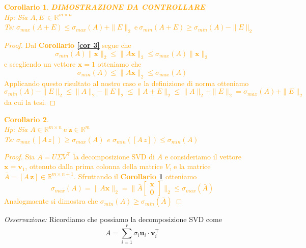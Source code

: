 \documentclass[11pt]{article}
\newtheorem{corollary}{Corollario}
\newcommand{\R}{\mathbb{R}} %
\begin{document}
\textcolor{orange}{
\begin{corollary}\label{cor 5}
\textbf{ DIMOSTRAZIONE DA CONTROLLARE }\\
\textit{Hp:} Sia $A,E \ \in \R^{m \times n}$\\
\textit{Ts:} $\sigma_{max}(A+E) \leq \sigma_{max}(A) + \|E\|_2 \ \text{e} \ \sigma_{min}(A+E) \geq \sigma_{min}(A) - \|E\|_2$ 
\end{corollary}
\begin{proof}
Dal \textbf{Corollario \ref{cor 3}}  segue che $$\sigma_{min}(A)\|\mathbf{x}\|_2 \leq \|A\mathbf{x}\|_2 \leq \sigma_{max}(A)\|\mathbf{x}\|_2$$
e scegliendo un vettore $\mathbf{x}=1$ otteniamo che
\[
\sigma_{min}(A) \leq \|A\mathbf{x}\|_2 \leq \sigma_{max}(A)
\]
Applicando questo risultato al nostro caso e la definizione di norma otteniamo
$$ \sigma_{min}(A) - \|E\|_2 \leq \|A\|_2 - \|E\|_2 \leq \|A+E\|_2 \leq \|A\|_2 + \|E\|_2 = \sigma_{max}(A) + \|E\|_2  $$
da cui la tesi. 
\end{proof}
}\textcolor{orange}{
\begin{corollary}\label{cor 6}
\textbf{}\\
\textit{Hp:} Sia $A \in \R^{m \times n} \ \text{e} \ \mathbf{z}\in \R^m$\\
\textit{Ts:} $\sigma_{max}([A \, z]) \geq \sigma_{max}(A)$ e $\sigma_{min}([A \, z]) \leq \sigma_{min}(A)$
\end{corollary}
\begin{proof}
Sia $A=U\Sigma V^\top      $ la decomposizione SVD di $A$ e consideriamo il vettore $\mathbf{x}= \mathbf{v}_1$, ottenuto dalla prima colonna della matrice $V$, e la matrice $\bar{A} = [A \, \mathbf{z}] \in \R^{m \times n+1}$. Sfruttando il \textbf{Corollario \ref{cor 5}} otteniamo
\[
\sigma_{max}(A)=\| A \mathbf{x} \|_2=\|\bar{A} \mathbf{\begin{bmatrix} x \\0 \end{bmatrix}}  \|_2 \leq \sigma_{max}(\bar{A})
\]
Analogmaente si dimostra che $\sigma_{min}(A) \geq \sigma_{min}(\bar{A}) $
\end{proof}
}
\noindent
\textit{Osservazione:} Ricordiamo che possiamo la decomposizione SVD come $$A = \sum_{i=1}^{r} \sigma_i \mathbf{u}_i \cdot \mathbf{v}_i^\top       $$
\end{document}

